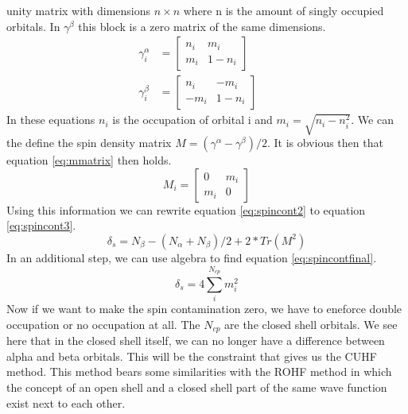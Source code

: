 \documentclass[twoside,twocolumn,9pt]{article}
\begin{document}
unity matrix with dimensions $n\times n$ where n is the amount of singly occupied orbitals. In $\gamma^\beta$ this block is a zero matrix of the same dimensions.
\begin{subequations}
  \begin{align}
    \label{eq:gammaa}
    \gamma^\alpha_i & = \begin{bmatrix}
      n_i & m_i    \\
      m_i & 1- n_i
    \end{bmatrix} &  & \\
    \label{eq:gammab}
    \gamma^\beta_i  & = \begin{bmatrix}
      n_i  & -m_i  \\
      -m_i & 1-n_i
    \end{bmatrix} &  &
  \end{align}
\end{subequations}
In these equations $n_i$ is the occupation of orbital i and $m_i = \sqrt{n_i - n_i^2}$\cite{Scuseria2010}. We can the define the spin density matrix $M = (\gamma^\alpha - \gamma^\beta)/2$. It is obvious then that equation \eqref{eq:mmatrix} then holds.
\begin{equation}\label{eq:mmatrix}
  M_i = \begin{bmatrix}
    0   & m_i \\
    m_i & 0
  \end{bmatrix}
\end{equation}
Using this information we can rewrite equation \eqref{eq:spincont2} to equation \eqref{eq:spincont3}\cite{Scuseria2010}.
\begin{equation}\label{eq:spincont3}
  \delta_s = N_\beta - (N_\alpha + N_\beta)/2 + 2*Tr(M^2)
\end{equation}
In an additional step, we can use algebra to find equation \eqref{eq:spincontfinal}.
\begin{equation}\label{eq:spincontfinal}
  \delta_s = 4\sum^{N_{cp}}_i m_i^2
\end{equation}
Now if we want to make the spin contamination zero, we have to eneforce double occupation or no occupation at all. The $N_{cp}$ are the closed shell orbitals. We see here that in
the closed shell itself, we can no longer have a difference between alpha and beta orbitals. This will be the constraint that gives us the CUHF method. This method bears some 
similarities with the ROHF method in which the concept of an open shell and a closed shell part of the same wave function exist next to each other.
\end{document}
